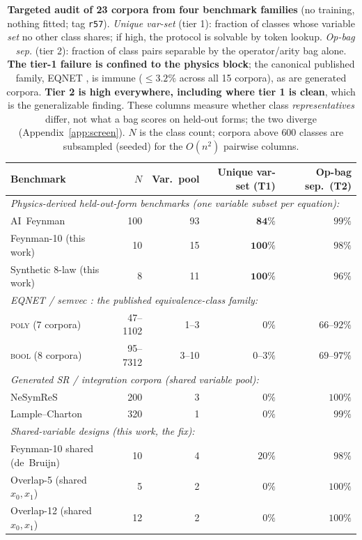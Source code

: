 \begin{table}[H]
\centering
\caption{\textbf{Targeted audit of 23 corpora from four benchmark families} (no training, nothing
fitted; tag \texttt{r57}). \emph{Unique var-set} (tier 1): fraction of classes whose variable
\emph{set} no other class shares; if high, the protocol is solvable by token lookup.
\emph{Op-bag sep.} (tier 2): fraction of class pairs separable by the operator/arity bag alone.
\textbf{The tier-1 failure is confined to the physics block}; the canonical published family, EQNET
\citep{allamanis2017learning}, is immune ($\leq 3.2\%$ across all 15 corpora), as are generated
corpora. \textbf{Tier 2 is high everywhere, including where tier 1 is clean}, which is the
generalizable finding. These columns measure whether class \emph{representatives} differ, not what a
bag scores on held-out forms; the two diverge (Appendix~\ref{app:screen}). $N$ is the class count;
corpora above $600$ classes are subsampled (seeded) for the $O(n^2)$ pairwise columns.}
\label{tab:benchmark_survey}
\footnotesize
\setlength{\tabcolsep}{3.2pt}
\begin{tabular}{l r r r r}
\toprule
Benchmark & $N$ & Var.\ pool & Unique var-set (T1) & Op-bag sep.\ (T2) \\
\midrule
\multicolumn{5}{l}{\emph{Physics-derived held-out-form benchmarks (one variable subset per equation):}} \\
AI~Feynman \citep{udrescu2020ai}      & 100 & 93 & $\mathbf{84\%}$  & $99\%$ \\
\quad Feynman-10 (this work)          & 10  & 15 & $\mathbf{100\%}$ & $98\%$ \\
\quad Synthetic 8-law (this work)     & 8   & 11 & $\mathbf{100\%}$ & $96\%$ \\
\midrule
\multicolumn{5}{l}{\emph{EQNET / semvec \citep{allamanis2017learning}: the published equivalence-class family:}} \\
\quad \textsc{poly} (7 corpora)       & 47--1102 & 1--3 & $0\%$   & $66$--$92\%$ \\
\quad \textsc{bool} (8 corpora)       & 95--7312 & 3--10 & $0$--$3\%$ & $69$--$97\%$ \\
\midrule
\multicolumn{5}{l}{\emph{Generated SR / integration corpora (shared variable pool):}} \\
NeSymReS \citep{biggio2021neural}     & 200 & 3  & $0\%$   & $100\%$ \\
Lample--Charton \citep{lample2019deep}& 320 & 1  & $0\%$   & $99\%$ \\
\midrule
\multicolumn{5}{l}{\emph{Shared-variable designs (this work, the fix):}} \\
Feynman-10 shared (de~Bruijn)         & 10  & 4  & $20\%$  & $98\%$ \\
Overlap-5 (shared $x_0,x_1$)          & 5   & 2  & $0\%$   & $100\%$ \\
Overlap-12 (shared $x_0,x_1$)         & 12  & 2  & $0\%$   & $100\%$ \\
\bottomrule
\end{tabular}
\end{table}
